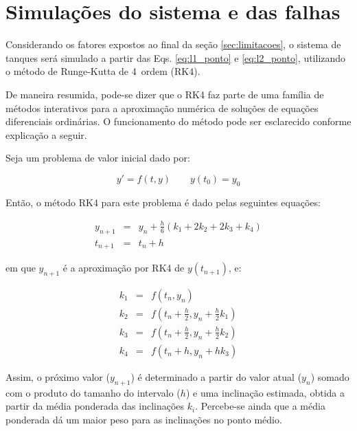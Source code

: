 \section{Simulações do sistema e das falhas}
Considerando os fatores expostos ao final da seção \ref{sec:limitacoes}, o
sistema de tanques será simulado a partir das Eqs. \ref{eq:l1_ponto} e
\ref{eq:l2_ponto}, utilizando o método de Runge-Kutta de 4\textordfeminine\
ordem (RK4).


De maneira resumida, pode-se dizer que o RK4 faz parte de uma família de métodos
interativos para a aproximação numérica de soluções de equações diferenciais
ordinárias. O funcionamento do método pode ser esclarecido conforme explicação a
seguir. 

Seja um problema de valor inicial dado por:

\begin{equation}\label{eq:}
y' = f(t,y) \qquad y(t_0) = y_0
\end{equation}

Então, o método RK4 para este problema é dado pelas seguintes equações:

\begin{eqnarray}
y_{n+1} & = & y_n + \frac{h}{6}\left(k_1 + 2k_2 + 2k_3 + k_4\right)\\
t_{n+1} & = & t_n + h
\end{eqnarray}

\noindent em que $y_{n+1}$ é a aproximação por RK4 de $y(t_{n + 1})$, e:

\begin{eqnarray}
k_1 & = & f\left(t_n,y_n\right)\\
k_2 & = & f\left(t_n+\frac{h}{2},y_n+\frac{h}{2}k_1\right)\\
k_3 & = & f\left(t_n+\frac{h}{2},y_n+\frac{h}{2}k_2\right)\\
k_4 & = & f\left(t_n+h,y_n+hk_3\right)
\end{eqnarray}

Assim, o próximo valor ($y_{n+1}$) é determinado a partir do valor atual ($y_n$)
somado com o produto do tamanho do intervalo ($h$) e uma inclinação estimada,
obtida a partir da média ponderada das inclinações $k_i$. Percebe-se ainda que a
média ponderada dá um maior peso para as inclinações no ponto médio.

